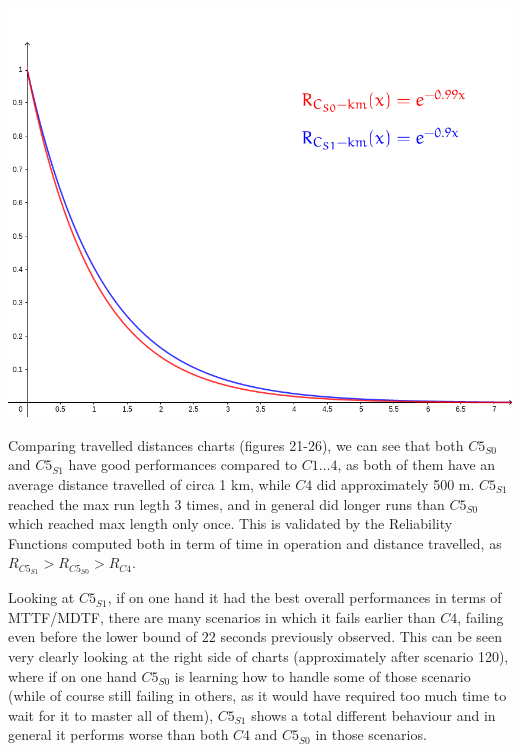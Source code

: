 \begin{minipage}[c]{\textwidth}
	\includegraphics[width=\textwidth]{img/reliability-pro-stupid-km-comparison.png}
\end{minipage}

\vspace{0.8cm}


Comparing travelled distances charts (figures 21-26), we can see that both $C5_{S0}$ and $C5_{S1}$ have good performances compared to $C1\dots 4$, as both of them have an average distance travelled of circa 1 km, while $C4$ did approximately 500 m. $C5_{S1}$ reached the max run legth 3 times, and in general did longer runs than $C5_{S0}$ which reached max length only once.
This is validated by the Reliability Functions computed both in term of time in operation and distance travelled, as $R_{C5_{S1}} > R_{C5_{S0}} > R_{C4}$.

Looking at $C5_{S1}$, if on one hand it had the best overall performances in terms of MTTF/MDTF, there are many scenarios in which it fails earlier than $C4$, failing even before the lower bound of $22$ seconds previously observed. This can be seen very clearly looking at the right side of charts (approximately after scenario 120), where if on one hand $C5_{S0}$ is learning how to handle some of those scenario (while of course still failing in others, as it would have required too much time to wait for it to master all of them), $C5_{S1}$ shows a total different behaviour and in general it performs worse than both $C4$ and $C5_{S0}$ in those scenarios.


